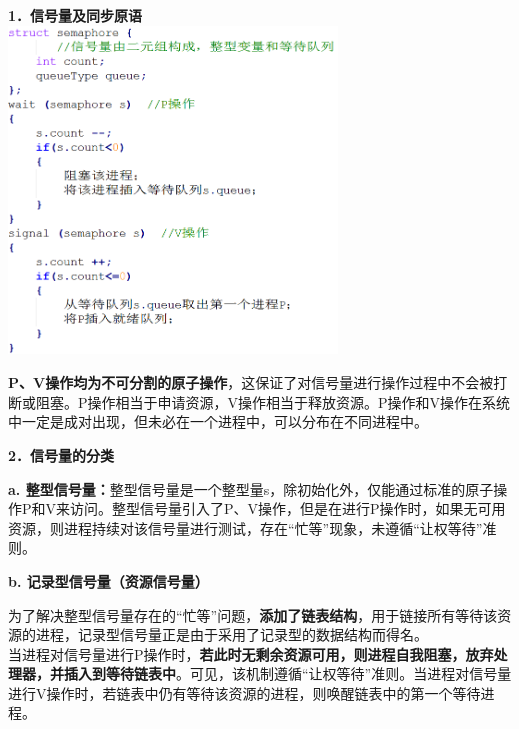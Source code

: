 \textbf{{1．信号量及同步原语}}\\

\includegraphics[width=3.43750in,height=3.42708in]{png-jpeg-pics/31A68F58564D5473718C17263BC2F1D7.png}

\textbf{{P、V操作均为不可分割的原子操作}}，这保证了对信号量进行操作过程中不会被打断或阻塞。P操作相当于申请资源，V操作相当于释放资源。P操作和V操作在系统中一定是成对出现，但未必在一个进程中，可以分布在不同进程中。

\textbf{{2．信号量的分类}}

\textbf{a.
整型信号量：}{整型信号量是一个整型量s，除初始化外，仅能通过标准的原子操作P和V来访问。整型信号量引入了P、V操作，但是在进行P操作时，如果无可用资源，则进程持续对该信号量进行测试，存在``忙等''现象，未遵循``让权等待''准则。}

\textbf{b. 记录型信号量（资源信号量）}

为了解决整型信号量存在的``忙等''问题，{\textbf{添加了链表结构}}，用于链接所有等待该资源的进程，记录型信号量正是由于采用了记录型的数据结构而得名。\\

当进程对信号量进行P操作时，\textbf{若此时无剩余资源可用，则进程自我阻塞，放弃处理器，并插入到等待链表中}。可见，该机制遵循``让权等待''准则。当进程对信号量进行V操作时，若链表中仍有等待该资源的进程，则唤醒链表中的第一个等待进程。

